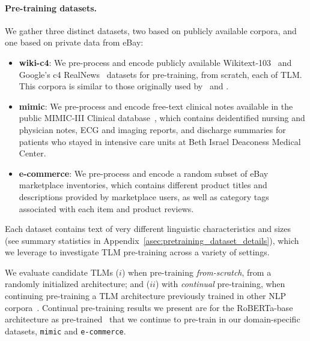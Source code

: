 \paragraph*{Pre-training datasets.} \hspace*{-2ex}
We gather three distinct datasets, two based on publicly available corpora,
and one based on private data from eBay:

\begin{itemize}[leftmargin=*]
	\item \textbf{wiki-c4}: We pre-process and encode publicly available Wikitext-103~\citep{wikitext103} 
	and 
	Google's c4 RealNews~\citep{c4_realnews} datasets
	for pre-training, from scratch, each of TLM.
	This corpora is similar to those originally used by~\citet{bert} and \citet{roberta}.%
	
	\item \textbf{mimic}: We pre-process and encode free-text clinical notes available in the public MIMIC-III Clinical database~\citep{mimic}, which contains deidentified nursing and physician notes, ECG and imaging reports, and discharge summaries for patients who stayed in intensive care units at Beth Israel Deaconess Medical Center.
	
	\item \textbf{e-commerce}: We pre-process and encode a random subset of eBay marketplace inventories, which contains different product titles and descriptions provided by marketplace users, as well as category tags associated with each item and product reviews.

\end{itemize}

Each dataset contains text of very different linguistic characteristics and sizes (see summary statistics in Appendix~\ref{asec:pretraining_dataset_details}),
which we leverage to investigate TLM pre-training across a variety of settings.

We evaluate candidate TLMs
($i$) when pre-training \textit{from-scratch}, \ie from a randomly initialized architecture; and
($ii$) with \textit{continual} pre-training, \ie when continuing pre-training a TLM architecture previously trained in other NLP corpora~\citep{kalyan2021ammus}.
%
Continual pre-training results we present are for the RoBERTa-base architecture as pre-trained~\citet{robertabase_fairseq}
that we continue to pre-train in our domain-specific datasets, \ie \texttt{mimic} and \texttt{e-commerce}.

